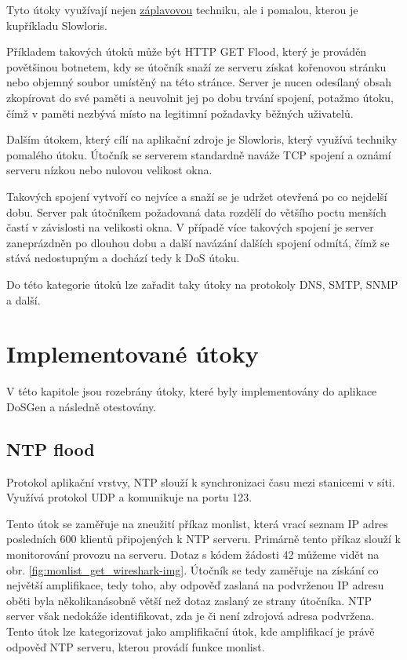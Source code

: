 Tyto útoky využívají nejen \hyperref[subs_zaplavove]{záplavovou} techniku, ale i pomalou, kterou je
kupříkladu Slowloris.
 
Příkladem takových útoků může být HTTP GET Flood, který je prováděn povětšinou botnetem, kdy
se útočník snaží ze serveru získat kořenovou stránku nebo objemný soubor umístěný na této
stránce. Server je nucen odesílaný obsah zkopírovat do své paměti a neuvolnit jej po dobu
trvání spojení, potažmo útoku, čímž v paměti nezbývá místo na legitimní požadavky běžných
uživatelů.

Dalším útokem, který cílí na aplikační zdroje je Slowloris, který využívá techniky pomalého
útoku. Útočník se serverem standardně naváže TCP spojení a oznámí serveru nízkou nebo nulovou
velikost okna.

Takových spojení vytvoří co nejvíce a snaží se je udržet otevřená po co nejdelší dobu.
Server pak útočníkem požadovaná data rozdělí do většího poctu menších častí v závislosti na
velikosti okna. V případě více takových spojení je server zaneprázdněn po dlouhou dobu a
další navázání dalších spojení odmítá, čímž se stává nedostupným a dochází tedy k DoS
útoku.

Do této kategorie útoků lze zařadit taky útoky na protokoly DNS, SMTP, SNMP a další.

\section{Implementované útoky}
\label{sec:implementovane_utoky}
V této kapitole jsou rozebrány útoky, které byly implementovány do aplikace DoSGen a následně otestovány.

\subsection{NTP flood}
\label{subsec:ntp_flood}
Protokol aplikační vrstvy, NTP slouží k synchronizaci času mezi stanicemi v síti.
Využívá protokol UDP a komunikuje na portu 123.

Tento útok se zaměřuje na zneužití příkaz monlist, která vrací seznam IP adres
posledních 600 klientů připojených k NTP serveru. Primárně tento příkaz slouží k
monitorování provozu na serveru. Dotaz s kódem žádosti 42  můžeme vidět
na obr. \ref{fig:monlist_get_wireshark-img}. Útočník se tedy zaměřuje na získání co
největší amplifikace, tedy toho, aby odpověď zaslaná na podvrženou IP adresu oběti
byla několikanásobně větší než dotaz zaslaný ze strany útočníka. NTP server však
nedokáže identifikovat, zda je či není zdrojová adresa podvržena.
Tento útok lze kategorizovat jako amplifikační útok, kde amplifikací je právě odpověď
NTP serveru, kterou provádí funkce monlist.

